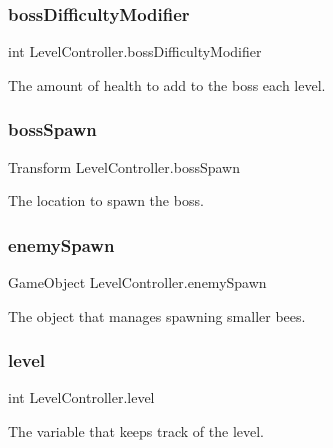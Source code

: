 \subsubsection{\texorpdfstring{bossDifficultyModifier}{bossDifficultyModifier}}
{\footnotesize\ttfamily int Level\+Controller.\+boss\+Difficulty\+Modifier}



The amount of health to add to the boss each level. 

\mbox{\label{class_level_controller_a986d38f2ec210fe0bd48aae961ebb1a7}} 
\subsubsection{\texorpdfstring{bossSpawn}{bossSpawn}}
{\footnotesize\ttfamily Transform Level\+Controller.\+boss\+Spawn}



The location to spawn the boss. 

\mbox{\label{class_level_controller_aa449cd525fbc71a079d640241e6ecff3}} 
\subsubsection{\texorpdfstring{enemySpawn}{enemySpawn}}
{\footnotesize\ttfamily Game\+Object Level\+Controller.\+enemy\+Spawn}



The object that manages spawning smaller bees. 

\mbox{\label{class_level_controller_ab3159878c28f1cf902172794006316d2}} 
\subsubsection{\texorpdfstring{level}{level}}
{\footnotesize\ttfamily int Level\+Controller.\+level}



The variable that keeps track of the level. 

